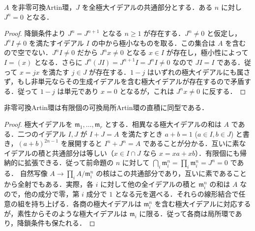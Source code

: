 \begin{prop}[Artin環の根基の冪零性]
$A$ を非零可換Artin環，$J$ を全極大イデアルの共通部分とする．ある $n$ に対し $J^n=0$ となる．
\end{prop}
\begin{proof}
降鎖条件より $J^n=J^{n+1}$ となる $n\geq1$ が存在する．$J^n\ne0$ と仮定し，$J^nI\ne0$ を満たすイデアル $I$ の中から極小なものを取る．この集合は $A$ を含むので空でない．$J^nI\ne0$ だから $J^nx\ne0$ となる $x\in I$ が存在し，極小性によって $I=(x)$ となる．さらに $J^n(JI)=J^{n+1}I=J^nI\ne0$ なので $JI=I$ である．従って $x=jx$ を満たす $j\in J$ が存在する．$1-j$ はいずれの極大イデアルにも属さず，もし非単元ならその生成イデアルを含む極大イデアルが存在するので矛盾する．従って $1-j$ は単元であり $x=0$ となるが，これは $J^nx\ne0$ に反する．
\end{proof}
\begin{prop}[Artin環の局所環分解]
非零可換Artin環は有限個の可換局所Artin環の直積に同型である．
\end{prop}
\begin{proof}
極大イデアルを $\mathfrak m_1,\ldots,\mathfrak m_r$ とする．相異なる極大イデアルの和は $A$ である．二つのイデアル $I,J$ が $I+J=A$ を満たすとき $a+b=1$ ($a\in I,b\in J$) と書き，$(a+b)^{2n-1}$ を展開すると $I^n+J^n=A$ であることが分かる．互いに素なイデアルの積と共通部分は等しい（$x\in I\cap J$ なら $x=xa+xb$）．有限個にも帰納的に拡張できる．従って前命題の $n$ に対して $\bigcap_i\mathfrak m_i^n=\prod_i\mathfrak m_i^n=J^n=0$ である．
自然写像 $A\to\prod_i A/\mathfrak m_i^n$ の核はこの共通部分であり，互いに素であることから全射でもある．実際，各 $i$ に対して他の全イデアルの積と $\mathfrak m_i^n$ の和は $A$ なので，他の成分で零，第 $i$ 成分で $1$ となる元を選べる．それらの線形結合で任意の組を持ち上げる．各商の極大イデアルは $\mathfrak m_i^n$ を含む極大イデアルに対応するが，素性からそのような極大イデアルは $\mathfrak m_i$ に限る．従って各商は局所環であり，降鎖条件も保たれる．
\end{proof}
